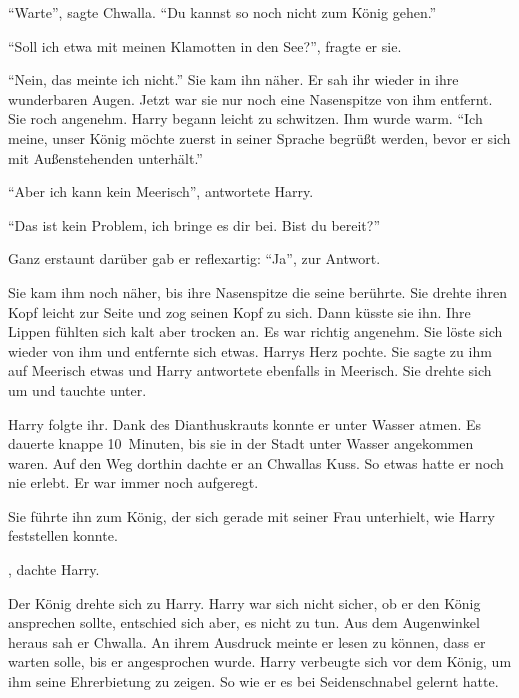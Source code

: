 \enquote{Warte}, sagte Chwalla. \enquote{Du kannst so noch nicht zum König gehen.}

\enquote{Soll ich etwa mit meinen Klamotten in den See?}, fragte er sie.

\enquote{Nein, das meinte ich nicht.} Sie kam ihn näher. Er sah ihr wieder in ihre wunderbaren Augen. Jetzt war sie nur noch eine Nasenspitze von ihm entfernt. Sie roch angenehm. Harry begann leicht zu schwitzen. Ihm wurde warm. \enquote{Ich meine, unser König möchte zuerst in seiner Sprache begrüßt werden, bevor er sich mit Außenstehenden unterhält.}

\enquote{Aber ich kann kein Meerisch}, antwortete Harry.

\enquote{Das ist kein Problem, ich bringe es dir bei. Bist du bereit?}

Ganz erstaunt darüber gab er reflexartig: \enquote{Ja}, zur Antwort.

Sie kam ihm noch näher, bis ihre Nasenspitze die seine berührte. Sie drehte ihren Kopf leicht zur Seite und zog seinen Kopf zu sich. Dann küsste sie ihn. Ihre Lippen fühlten sich kalt aber trocken an. Es war richtig angenehm. Sie löste sich wieder von ihm und entfernte sich etwas. Harrys Herz pochte. Sie sagte zu ihm auf Meerisch etwas und Harry antwortete ebenfalls in Meerisch.  Sie drehte sich um und tauchte unter.

Harry folgte ihr. Dank des Dianthuskrauts konnte er unter Wasser atmen. Es dauerte knappe 10~Minuten, bis sie in der Stadt unter Wasser angekommen waren. Auf den Weg dorthin dachte er an Chwallas Kuss. So etwas hatte er noch nie erlebt. Er war immer noch aufgeregt.

Sie führte ihn zum König, der sich gerade mit seiner Frau unterhielt, wie Harry feststellen konnte. 

, dachte Harry. 

Der König drehte sich zu Harry. Harry war sich nicht sicher, ob er den König ansprechen sollte, entschied sich aber, es nicht zu tun. Aus dem Augenwinkel heraus sah er Chwalla. An ihrem Ausdruck meinte er lesen zu können, dass er warten solle, bis er angesprochen wurde. Harry verbeugte sich vor dem König, um ihm seine Ehrerbietung zu zeigen. So wie er es bei Seidenschnabel gelernt hatte.

